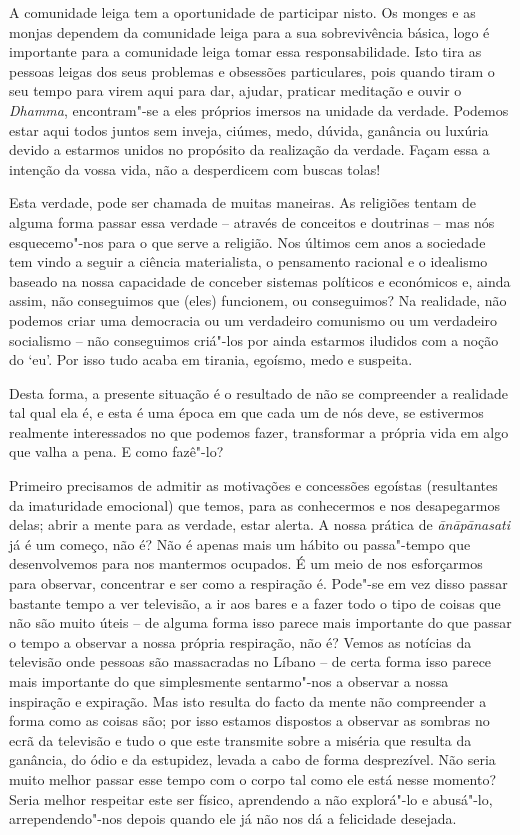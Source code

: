 A comunidade leiga tem a oportunidade de participar nisto. Os monges e
as monjas dependem da comunidade leiga para a sua sobrevivência básica,
logo é importante para a comunidade leiga tomar essa responsabilidade.
Isto tira as pessoas leigas dos seus problemas e obsessões particulares,
pois quando tiram o seu tempo para virem aqui para dar, ajudar, praticar
meditação e ouvir o \emph{Dhamma}, encontram"-se a eles próprios imersos
na unidade da verdade. Podemos estar aqui todos juntos sem inveja,
ciúmes, medo, dúvida, ganância ou luxúria devido a estarmos unidos no
propósito da realização da verdade. Façam essa a intenção da vossa vida,
não a desperdicem com buscas tolas!

Esta verdade, pode ser chamada de muitas maneiras. As religiões tentam
de alguma forma passar essa verdade -- através de conceitos e doutrinas
-- mas nós esquecemo"-nos para o que serve a religião. Nos últimos cem
anos a sociedade tem vindo a seguir a ciência materialista, o pensamento
racional e o idealismo baseado na nossa capacidade de conceber sistemas
políticos e económicos e, ainda assim, não conseguimos que (eles)
funcionem, ou conseguimos? Na realidade, não podemos criar uma democracia
ou um verdadeiro comunismo ou um verdadeiro socialismo -- não
conseguimos criá"-los por ainda estarmos iludidos com a noção do `eu'.
Por isso tudo acaba em tirania, egoísmo, medo e suspeita.

Desta forma, a presente situação é o resultado de não se compreender a
realidade tal qual ela é, e esta é uma época em que cada um de nós deve,
se estivermos realmente interessados no que podemos fazer, transformar a
própria vida em algo que valha a pena. E como fazê"-lo?

Primeiro precisamos de admitir as motivações e concessões egoístas
(resultantes da imaturidade emocional) que temos, para as conhecermos e
nos desapegarmos delas; abrir a mente para as verdade, estar alerta. A
nossa prática de \emph{ānāpānasati} já é um começo, não é? Não é apenas
mais um hábito ou passa"-tempo que desenvolvemos para nos mantermos
ocupados. É um meio de nos esforçarmos para observar, concentrar e ser
como a respiração é. Pode"-se em vez disso passar bastante tempo a ver
televisão, a ir aos bares e a fazer todo o tipo de coisas que não são 
muito úteis -- de alguma forma isso parece mais importante do que
passar o tempo a observar a nossa própria respiração, não é? Vemos as
notícias da televisão onde pessoas são massacradas no Líbano -- de certa
forma isso parece mais importante do que simplesmente sentarmo"-nos a
observar a nossa inspiração e expiração. Mas isto resulta do facto da
mente não compreender a forma como as coisas são; por isso estamos
dispostos a observar as sombras no ecrã da televisão e tudo o que este
transmite sobre a miséria que resulta da ganância, do ódio e da
estupidez, levada a cabo de forma desprezível. Não seria muito melhor
passar esse tempo com o corpo tal como ele está nesse momento? Seria
melhor respeitar este ser físico, aprendendo a não explorá"-lo e
abusá"-lo, arrependendo"-nos depois quando ele já não nos dá a felicidade
desejada.

